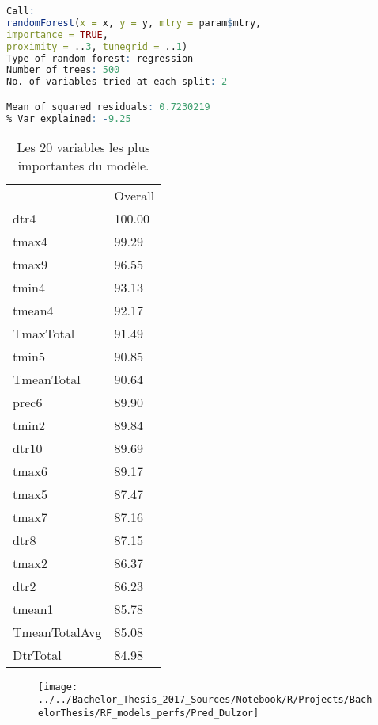 \begin{minipage}{\linewidth}
	
	\begin{lstlisting}[showstringspaces=false,language=R, caption={Test du modèle de classification},captionpos=b]
Call:
randomForest(x = x, y = y, mtry = param$mtry, 
importance = TRUE,      
proximity = ..3, tunegrid = ..1) 
Type of random forest: regression
Number of trees: 500
No. of variables tried at each split: 2

Mean of squared residuals: 0.7230219
% Var explained: -9.25
	\end{lstlisting}
\end{minipage}


\begin{table}[H]
	\centering
	\caption{Les 20 variables les plus importantes du modèle.}
	\label{RF_Dulzor_Varimp}
	\begin{tabular}{ll}
              & Overall \\
dtr4          & 100.00  \\
tmax4         & 99.29   \\
tmax9         & 96.55   \\
tmin4         & 93.13   \\
tmean4        & 92.17   \\
TmaxTotal     & 91.49   \\
tmin5         & 90.85   \\
TmeanTotal    & 90.64   \\
prec6         & 89.90   \\
tmin2         & 89.84   \\
dtr10         & 89.69   \\
tmax6         & 89.17   \\
tmax5         & 87.47   \\
tmax7         & 87.16   \\
dtr8          & 87.15   \\
tmax2         & 86.37   \\
dtr2          & 86.23   \\
tmean1        & 85.78   \\
TmeanTotalAvg & 85.08   \\
DtrTotal      & 84.98
	\end{tabular}
\end{table}


\begin{figure}[H]
	\centering
	\texttt{[image: ../../Bachelor\_Thesis\_2017\_Sources/Notebook/R/Projects/BachelorThesis/RF\_models\_perfs/Pred\_Dulzor]}
	\caption{}
	\label{fig:preddulzor}
\end{figure}


